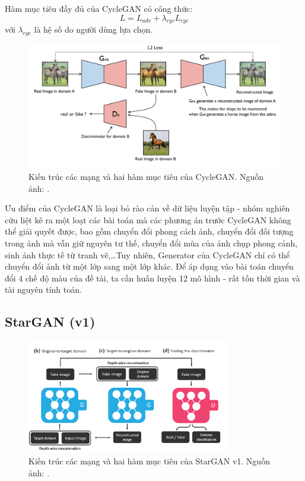 \documentclass[12pt]{extreport}
\begin{document}
Hàm mục tiêu đầy đủ của CycleGAN có công thức:
$$ L = L_{adv} + \lambda_{cyc} L_{cyc} $$
với $ \lambda_{cyc} $ là hệ số do người dùng lựa chọn.

\begin{figure}[H]
    \centering
    \includegraphics[width=\textwidth]{figure16}
    \caption{Kiến trúc các mạng và hai hàm mục tiêu của CycleGAN. Nguồn ảnh: \cite{mnistsvhntransfer}.}
\end{figure}

Ưu điểm của CycleGAN là loại bỏ rào cản về dữ liệu luyện tập - nhóm nghiên cứu liệt kê ra một loạt các bài toán mà các phương án trước CycleGAN không thể giải quyết được, bao gồm chuyển đổi phong cách ảnh, chuyển đổi đối tượng trong ảnh mà vẫn giữ nguyên tư thế, chuyển đổi mùa của ảnh chụp phong cảnh, sinh ảnh thực tế từ tranh vẽ,\dots Tuy nhiên, Generator của CycleGAN chỉ có thể chuyển đổi ảnh từ một lớp sang một lớp khác. Để áp dụng vào bài toán chuyển đổi 4 chế độ màu của đề tài, ta cần huấn luyện 12 mô hình - rất tốn thời gian và tài nguyên tính toán.

\subsection{StarGAN (v1)}

\begin{figure}[H]
    \centering
    \includegraphics[width=0.8\textwidth]{figure17}
    \caption{Kiến trúc các mạng và hai hàm mục tiêu của StarGAN v1. Nguồn ảnh: \cite{DBLP:journals/corr/abs-1711-09020}.}
\end{figure}
\end{document}
